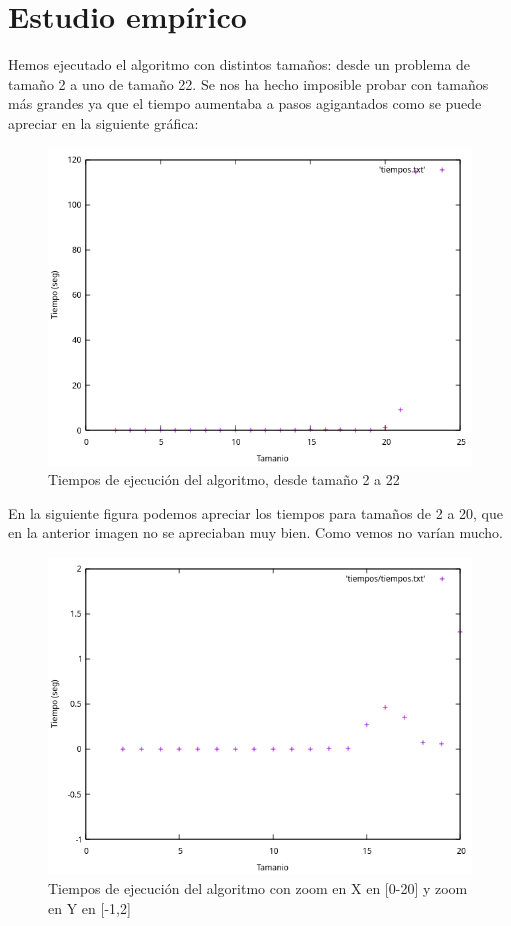 \documentclass{article}
\begin{document}
	\section{Estudio empírico}
	Hemos ejecutado el algoritmo con distintos tamaños: desde un problema de tamaño 2 a uno de tamaño 22. Se nos ha hecho imposible probar con tamaños más grandes ya que el tiempo aumentaba a pasos agigantados como se puede apreciar en la siguiente gráfica:
	\begin{figure}[H]
		\centering
		\includegraphics[totalheight=7cm]{grafica1}
		\caption{Tiempos de ejecución del algoritmo, desde tamaño 2 a 22}
		\label{fig:eficiencia_empirica}
	\end{figure}
	En la siguiente figura podemos apreciar los tiempos para tamaños de 2 a 20, que en la anterior imagen no se apreciaban muy bien. Como vemos no varían mucho.
	\begin{figure}[H]
		\centering
		\includegraphics[totalheight=7cm]{grafica_intervalo_peque}
		\caption{Tiempos de ejecución del algoritmo con zoom en X en [0-20] y zoom en Y en [-1,2]}
		\label{fig:eficiencia_empirica_zoom}
	\end{figure}
\end{document}
